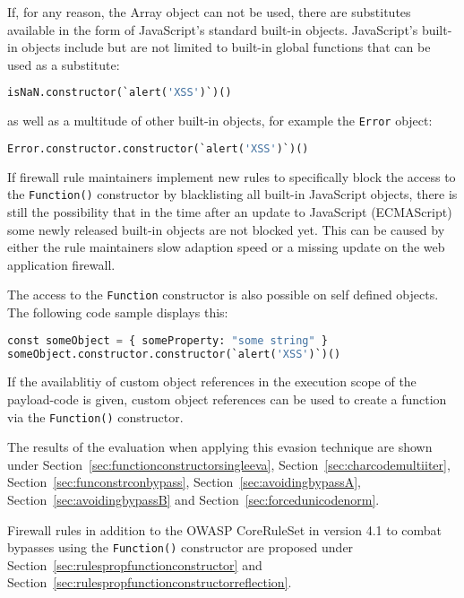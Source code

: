 If, for any reason, the Array object can not be used, there are substitutes available in the form of JavaScript's standard built-in objects.
JavaScript's built-in objects include but are not limited to built-in global functions that can be used as a substitute: \cite{js/builtin}

\begin{lstlisting}[style=basicStyle,language=Python,escapeinside=\^\^]
isNaN.constructor(`alert('XSS')`)()
\end{lstlisting}
as well as a multitude of other built-in objects, for example the \verb|Error| object:

\begin{lstlisting}[style=basicStyle,language=Python,escapeinside=\^\^]
Error.constructor.constructor(`alert('XSS')`)()
\end{lstlisting}
If firewall rule maintainers implement new rules to specifically block the access to the \verb|Function()| constructor by blacklisting all built-in JavaScript objects, there is still the possibility that in the time after an update to JavaScript (ECMAScript) some newly released built-in objects are not blocked yet. This can be caused by either the rule maintainers slow adaption speed or a missing update on the web application firewall.

The access to the \verb|Function| constructor is also possible on self defined objects. The following code sample displays this:

\begin{lstlisting}[style=basicStyle,language=Python,escapeinside=\^\^]
const someObject = { someProperty: "some string" }
someObject.constructor.constructor(`alert('XSS')`)()
\end{lstlisting}
If the availablitiy of custom object references in the execution scope of the payload-code is given, custom object references can be used to create a function via the \verb|Function()| constructor.

The results of the evaluation when applying this evasion technique are shown under Section~\ref{sec:functionconstructorsingleeva}, Section~\ref{sec:charcodemultiiter}, Section~\ref{sec:funconstrconbypass}, Section~\ref{sec:avoidingbypassA}, Section~\ref{sec:avoidingbypassB} and Section~\ref{sec:forcedunicodenorm}.

Firewall rules in addition to the OWASP CoreRuleSet in version 4.1 to combat bypasses using the \verb|Function()| constructor are proposed under Section~\ref{sec:rulespropfunctionconstructor} and Section~\ref{sec:rulespropfunctionconstructorreflection}.


